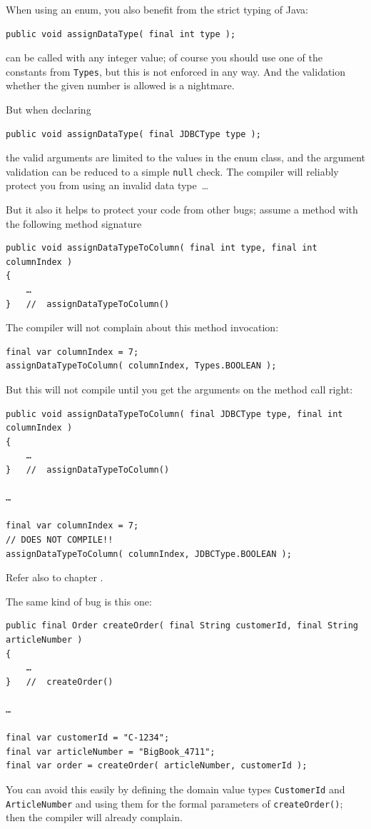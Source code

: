 When using an enum, you also benefit from the strict typing of Java:
\begin{lstlisting}
public void assignDataType( final int type );
\end{lstlisting}
can be called with any integer value; of course you should use one of the constants from \lstinline|Types|, but this is not enforced in any way. And the validation whether the given number is allowed is a nightmare.

But when declaring
\begin{lstlisting}
public void assignDataType( final JDBCType type );
\end{lstlisting}
the valid arguments are limited to the values in the enum class, and the argument validation can be reduced to a simple \lstinline|null| check. The compiler will reliably protect you from using an invalid data type~…

But it also it helps to protect your code from other bugs; assume a method with the following method signature
\begin{lstlisting}
public void assignDataTypeToColumn( final int type, final int columnIndex )
{
    …
}   //  assignDataTypeToColumn()
\end{lstlisting}

The compiler will not complain about this method invocation:
\begin{lstlisting}
final var columnIndex = 7;
assignDataTypeToColumn( columnIndex, Types.BOOLEAN );
\end{lstlisting}

But this will not compile until you get the arguments on the method call right:
\begin{lstlisting}
public void assignDataTypeToColumn( final JDBCType type, final int columnIndex )
{
    …
}   //  assignDataTypeToColumn()

…

final var columnIndex = 7;
// DOES NOT COMPILE!!
assignDataTypeToColumn( columnIndex, JDBCType.BOOLEAN );
\end{lstlisting}
Refer also to chapter .

The same kind of bug is this one:
\begin{lstlisting}
public final Order createOrder( final String customerId, final String articleNumber )
{
    …
}   //  createOrder()

…

final var customerId = "C-1234";
final var articleNumber = "BigBook_4711";
final var order = createOrder( articleNumber, customerId );
\end{lstlisting}
You can avoid this easily by defining the domain value types \lstinline|CustomerId| and \lstinline|ArticleNumber| and using them for the formal parameters of \lstinline|createOrder()|; then the compiler will already complain.

